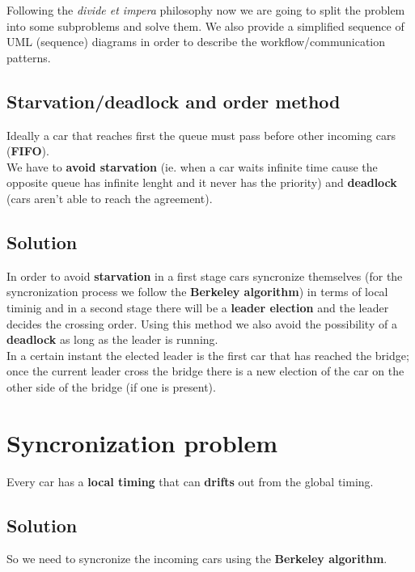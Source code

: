 Following the \textit{divide et impera} philosophy now we are going to split the problem 
into some subproblems and solve them. 
We also provide a simplified sequence of UML (sequence) diagrams in order to 
describe the workflow/communication patterns.

\subsection{Starvation/deadlock and order method}

Ideally a car that reaches first the queue must pass before other 
incoming cars (\textbf{FIFO}).\\

We have to \textbf{avoid starvation} (ie. when a car waits infinite time cause the opposite queue 
has infinite lenght and it never has the priority) and \textbf{deadlock} (cars aren't able to 
reach the agreement). 


\subsection{Solution}

In order to avoid \textbf{starvation} in a first stage cars syncronize themselves 
(for the syncronization process we follow the \textbf{Berkeley algorithm})
in terms of local timinig and in a second stage there will be a \textbf{leader election} 
and the leader decides the crossing order. Using this method we also avoid 
the possibility of a \textbf{deadlock} as long as the leader is running.\\

In a certain instant the elected leader is the first car that has reached the bridge; 
once the current leader cross the bridge there is a new election of the car on the other 
side of the bridge (if one is present).\\


\section{Syncronization problem}

Every car has a \textbf{local timing} that can \textbf{drifts} out from the 
global timing. 

\subsection{Solution}

So we need to syncronize the incoming cars using the \textbf{Berkeley algorithm}.\\

